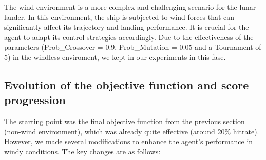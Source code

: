 \documentclass[a4paper, 12pt, fleqn]{report}
\begin{document}
\noindent
The wind environment is a more complex and challenging scenario for the lunar lander. In this environment, the ship is subjected to wind forces that can significantly affect its trajectory and landing performance. It is crucial for the agent to adapt its control strategies accordingly. Due to the effectiveness of the parameters (Prob\_Crossover = 0.9, Prob\_Mutation = 0.05 and a Tournament of 5) in the windless enviroment, we kept in our experiments in this fase.\\

\subsection*{Evolution of the objective function and score progression}

\noindent
The starting point was the final objective function from the previous section (non-wind environment), which was already quite effective (around 20\% hitrate). However, we made several modifications to enhance the agent's performance in windy conditions. The key changes are as follows:
\end{document}
